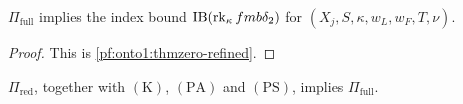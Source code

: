 \begin{lemma}\label{pf:onto1:concl_of_inputs4}
$\Pi_{\mathrm{full}}$ implies the index bound $\mathrm{IB}(\operatorname{rk}_\kappa fmb\delta_2)$ for $(X_j,S,\kappa,w_L,w_F,T,\nu)$.
\end{lemma}

\begin{proof}
This is \cref{pf:onto1:thmzero-refined}.
\end{proof}

\begin{proposition}\label{pf:onto1:inputs4_of_inputsR}
$\Pi_{\mathrm{red}}$, together with $(\mathrm K)$, $(\mathrm{PA})$ and $(\mathrm{PS})$, implies $\Pi_{\mathrm{full}}$.
\end{proposition}

